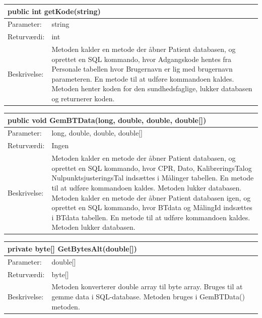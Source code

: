 \begin{table}[H]
\label{tab:tabel2}
\begin{tabular}{| l | p{13cm} |}
   \hline
   \multicolumn{2}{|l|}{public int getKode(string)} \\ \hline
   Parameter: & string \\ \hline
   Returværdi: & int\\ \hline
   Beskrivelse: & Metoden kalder en metode der åbner Patient databasen, og oprettet en SQL kommando, hvor Adgangskode hentes fra Personale tabellen hvor Brugernavn er lig med brugernavn parameteren. En metode til at udføre kommandoen kaldes. Metoden henter koden for den sundhedsfaglige, lukker databasen og returnerer koden. \\ \hline
\end{tabular}
\end{table}
\begin{table}[H]
\label{tab:tabel2}
\begin{tabular}{| l | p{13cm} |}
   \hline
   \multicolumn{2}{|l|}{public void GemBTData(long, double, double, double[])} \\ \hline
   Parameter: & long, double, double, double[] \\ \hline
   Returværdi: & Ingen\\ \hline
   Beskrivelse: & Metoden kalder en metode der åbner Patient databasen, og oprettet en SQL kommando, hvor CPR, Dato, KalibreringsTalog NulpunktsjusteringsTal indsættes i Målinger tabellen. En metode til at udføre kommandoen kaldes. Metoden lukker databasen. Metoden kalder en metode der åbner Patient databasen igen, og oprettet en SQL kommando, hvor BTdata og MålingId indsættes i BTdata tabellen. En metode til at udføre kommandoen kaldes. Metoden lukker databasen.  \\ \hline
\end{tabular}
\end{table}
\begin{table}[H]
\label{tab:tabel2}
\begin{tabular}{| l | p{13cm} |}
   \hline
   \multicolumn{2}{|l|}{ private byte[] GetBytesAlt(double[])} \\ \hline
   Parameter: & double[] \\ \hline
   Returværdi: & byte[]\\ \hline
   Beskrivelse: & Metoden konverterer double array til byte array. Bruges til at gemme data i SQL-database. Metoden bruges i GemBTData() metoden. \\ \hline
\end{tabular}
\end{table}

